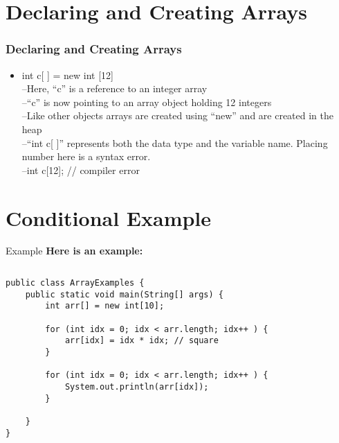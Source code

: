 \documentclass{beamer}
\begin{document}
\section{Declaring and Creating Arrays}

\begin{frame}
\frametitle{Declaring and Creating Arrays}
\begin{itemize}
\item int c[ ] = new int [12]\\
–Here, “c” is a reference to an integer array\\
–“c” is now pointing to an array object holding 12 integers\\
–Like other objects arrays are created using “new” and are created in the heap\\
–“int c[ ]” represents both the data type and the variable name. Placing number here is a syntax error.\\
–int c[12]; // compiler error\\
\end{itemize}
\end{frame}

\section{Conditional Example}


\begin{frame}[fragile]{Example}
\textbf{Here is an example:}\\
\begin{columns}[T]
\begin{column}{\textwidth}
\begin{lstlisting}
public class ArrayExamples {
    public static void main(String[] args) {
        int arr[] = new int[10];

        for (int idx = 0; idx < arr.length; idx++ ) {
            arr[idx] = idx * idx; // square
        }

        for (int idx = 0; idx < arr.length; idx++ ) {
            System.out.println(arr[idx]);
        }

    }
}
\end{lstlisting}
\end{column}
\end{columns}
\end{frame}
\end{document}
